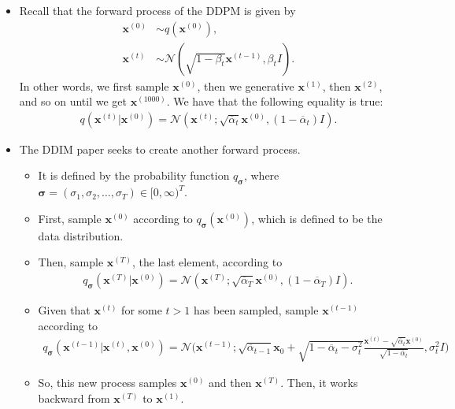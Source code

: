 \documentclass[10pt]{article}
\newcommand{\ve}[1]{\mathbf{#1}}
\newcommand{\ves}[1]{\boldsymbol{#1}}
\newcommand{\mcal}[1]{\mathcal{#1}}
\begin{document}
\begin{itemize}
  \item Recall that the forward process of the DDPM is given by
  \begin{align*}
    \ve{x}^{(0)} &\sim q(\ve{x}^{(0)}),\\
    \ve{x}^{(t)} &\sim \mcal{N}(\sqrt{1 - \beta_t} \ve{x}^{(t-1)}, \beta_t I).
  \end{align*}
  In other words, we first sample $\ve{x}^{(0)}$, then we generative $\ve{x}^{(1)}$, then $\ve{x}^{(2)}$, and so on until we get $\ve{x}^{(1000)}$. We have that the following equality is true:
  \begin{align*}
    q(\ve{x}^{(t)}|\ve{x}^{(0)}) = \mcal{N}(\ve{x}^{(t)}; \sqrt{\overline{\alpha}_t}\ve{x}^{(0)}, (1 - \overline{\alpha}_t) I).
  \end{align*}

  \item The DDIM paper seeks to create another forward process.
  \begin{itemize}
    \item It is defined by the probability function $q_{\ves{\sigma}}$, where $\ves{\sigma} = (\sigma_1, \sigma_2, \dotsc, \sigma_T) \in [0,\infty)^T$.
    \item First, sample $\ve{x}^{(0)}$ according to $q_{\ves{\sigma}}(\ve{x}^{(0)})$, which is defined to be the data distribution.
    \item Then, sample $\ve{x}^{(T)}$, the last element, according to
    \begin{align*}
      q_{\ves{\sigma}}(\ve{x}^{(T)}|\ve{x}^{(0)}) = \mcal{N}(\ve{x}^{(T)}; \sqrt{\overline{\alpha}_T}\ve{x}^{(0)}, (1 - \overline{\alpha}_T) I).
    \end{align*}
    \item Given that $\ve{x}^{(t)}$ for some $t > 1$ has been sampled, sample $\ve{x}^{(t-1)}$ according to
    \begin{align*}
      q_{\ves{\sigma}}(\ve{x}^{(t-1)}|\ve{x}^{(t)}, \ve{x}^{(0)}) = \mcal{N}\bigg( \ve{x}^{(t-1)} ; \sqrt{\overline{\alpha}_{t-1}} \ve{x}_0 + \sqrt{1 - \overline{\alpha}_t - \sigma_t^2 } \frac{\ve{x}^{(t)} - \sqrt{\overline{\alpha}_t} \ve{x}^{(0)}}{\sqrt{1 - \overline{\alpha}_t}}, \sigma_t^2 I \bigg)
    \end{align*}
    \item So, this new process samples $\ve{x}^{(0)}$ and then $\ve{x}^{(T)}$. Then, it works backward from $\ve{x}^{(T)}$ to $\ve{x}^{(1)}$.
  \end{itemize}


\end{itemize}
\end{document}

